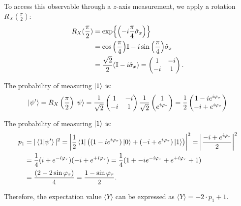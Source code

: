 To access this observable through a $z$-axis measurement, we apply a rotation $R_X(\frac{\pi}{2})$:
\begin{align}\label{eq:RX90}
    R_X(\frac{\pi}{2}) &= \exp{\left( -i\frac{\pi}{4}\hat{\sigma}_x\right)}\\
    &= \cos{\left(\frac{\pi}{4}\right)}\mathbb{I} - i\sin{\left(\frac{\pi}{4}\right)}\hat{\sigma}_x\\
    &= \frac{\sqrt{2}}{2}(\mathbb{I} -i\hat{\sigma}_x) = \begin{pmatrix}
        1 & -i \\
        -i & 1
        \end{pmatrix}.
\end{align}

The probability of measuring $\ket{1}$ is:
\begin{equation}
    \ket{\psi'} = R_X\left(\frac{\pi}{2}\right) \ket{\psi} = \frac{1}{\sqrt{2}} 
\begin{pmatrix}
1 & -i \\
-i & 1
\end{pmatrix}
\frac{1}{\sqrt{2}} 
\begin{pmatrix}
1\\
e^{i\varphi_\tau}
\end{pmatrix}
= \frac{1}{2}
\begin{pmatrix}
1 - ie^{i\varphi_\tau} \\
-i + e^{i\varphi_\tau}
\end{pmatrix}
\end{equation}

The probability of measuring $\ket{1}$ is:
\begin{align}\label{eq:P1Y}
    p_1 &= |\braket{1 | \psi'}|^2 = \left| \frac{1}{2} \bra{1} \left( (1 - ie^{i\varphi_\tau})\ket{0} + (-i + e^{i\varphi_\tau})\ket{1} \right) \right|^2 = \left| \frac{-i + e^{i\varphi_\tau}}{2} \right|^2\\
        &= \frac{1}{4} (i+e^{-i\varphi_\tau})(-i+e^{+i\varphi_\tau}) = \frac{1}{4}(1 + -ie^{-i\varphi_\tau} + e^{+i\varphi_\tau} +1)\\ 
        &=\frac{(2- 2\sin{\varphi_\tau})}{4} = \frac{1 -\sin{\varphi_\tau}}{2}.
\end{align}

Therefore, the expectation value $\langle Y \rangle$ can be expressed as $\langle Y \rangle =- 2\cdot p_1 + 1$.

